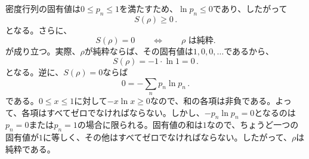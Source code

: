 \documentclass[a4paper,11pt,oneside]{article}
\theoremstyle{definition}
\numberwithin{equation}{section}
\begin{document}
密度行列の固有値は$0 \le p_n \le 1$を満たすため、$\ln p_n \le 0$であり、したがって
\begin{equation}
S(\rho) \ge 0 \,.
\end{equation}
となる。さらに、
\begin{equation}
S(\rho)=0
\qquad \Longleftrightarrow \qquad
\rho \text{ は純粋}.
\end{equation}
が成り立つ。実際、$\rho$が純粋ならば、その固有値は$1,0,0,\dots$であるから、
\begin{equation}
S(\rho) = - 1 \cdot \ln 1 = 0 \,.
\end{equation}
となる。逆に、$S(\rho)=0$ならば
\begin{equation}
0 = - \sum_n p_n \ln p_n \,.
\end{equation}
である。$0\le x \le 1$に対して$-x \ln x \ge 0$なので、和の各項は非負である。よって、各項はすべてゼロでなければならない。しかし、$-p_n \ln p_n =0$となるのは$p_n=0$または$p_n=1$の場合に限られる。固有値の和は$1$なので、ちょうど一つの固有値が$1$に等しく、その他はすべてゼロでなければならない。したがって、$\rho$は純粋である。
\end{document}
